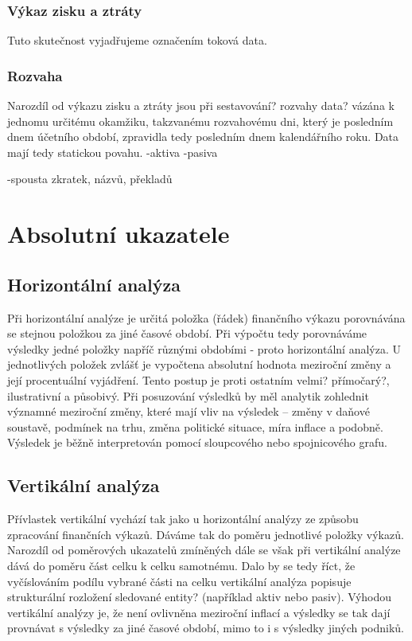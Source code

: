 \subsubsection{Výkaz zisku a ztráty}
Tuto skutečnost vyjadřujeme označením toková data.

\subsubsection{Rozvaha}
Narozdíl od výkazu zisku a ztráty jsou při sestavování? rozvahy data? vázána k jednomu určitému okamžiku, takzvanému rozvahovému dni, který je posledním dnem účetního období, zpravidla tedy posledním dnem kalendářního roku. Data mají tedy statickou povahu.
-aktiva
-pasiva

-spousta zkratek, názvů, překladů
\section{Absolutní ukazatele}

\subsection{Horizontální analýza}
Při horizontální analýze je určitá položka (řádek) finančního výkazu porovnávána se stejnou položkou za jiné časové období. Při výpočtu tedy porovnáváme výsledky jedné položky napříč různými obdobími - proto horizontální analýza. U jednotlivých položek zvlášť je vypočtena absolutní hodnota meziroční změny a její procentuální vyjádření. Tento postup je proti ostatním velmi? přímočarý?, ilustrativní a působivý. Při posuzování výsledků by měl analytik zohlednit významné meziroční změny, které mají vliv na výsledek -- změny v daňové soustavě, podmínek na trhu, změna politické situace, míra inflace a podobně. Výsledek je běžně interpretován pomocí sloupcového nebo spojnicového grafu. 


\subsection{Vertikální analýza}
Přívlastek vertikální vychází tak jako u horizontální analýzy ze způsobu zpracování finančních výkazů. Dáváme tak do poměru jednotlivé položky výkazů. Narozdíl od poměrových ukazatelů zmíněných dále se však při vertikální analýze dává do poměru část celku k celku samotnému. Dalo by se tedy říct, že vyčíslováním podílu vybrané části na celku vertikální analýza popisuje strukturální rozložení sledované entity? (například aktiv nebo pasiv). 
Výhodou vertikální analýzy je, že není ovlivněna meziroční inflací a výsledky se tak dají provnávat s výsledky za jiné časové období, mimo to i s výsledky jiných podniků\cite{sedl}.
